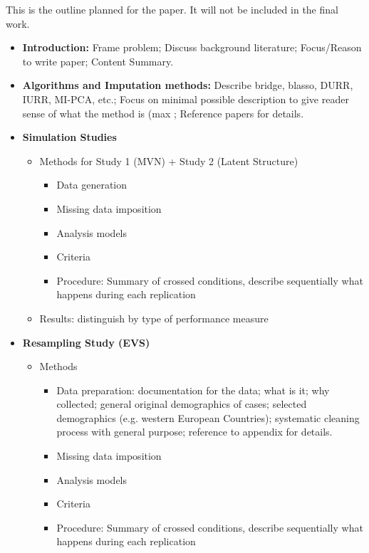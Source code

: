 This is the outline planned for the paper. It will not be included in the final work.

\begin{itemize}

 \item \textbf{Introduction:}
	Frame problem; 
	Discuss background literature;
	Focus/Reason to write paper;
	Content Summary.

 \item \textbf{Algorithms and Imputation methods:}
	Describe bridge, blasso, DURR, IURR, MI-PCA, etc.;
	Focus on minimal possible description to give reader sense of what the method is (max \cite{dengEtAl:2016};
	Reference papers for details.

 \item \textbf{Simulation Studies}

  \begin{itemize}

   \item Methods for Study 1 (MVN) + Study 2 (Latent Structure)

	\begin{itemize}
 	   \item Data generation
	   \item Missing data imposition
	   \item Analysis models
	   \item Criteria
	   \item Procedure: Summary of crossed conditions, describe sequentially 
		what happens during each replication
	\end{itemize}

   \item Results: distinguish by type of performance measure

  \end{itemize}

 \item \textbf{Resampling Study (EVS)}
  \begin{itemize}
	\item Methods

	\begin{itemize}

 	   \item Data preparation: 
		documentation for the data;
		what is it;
		why collected;
		general original demographics of cases;
		selected demographics (e.g. western European Countries);
		systematic cleaning process with general purpose;
		reference to appendix for details.
	   \item Missing data imposition
	   \item Analysis models
	   \item Criteria
	   \item Procedure: Summary of crossed conditions, describe sequentially 
		what happens during each replication


\end{itemize}
\end{itemize}
\end{itemize}
